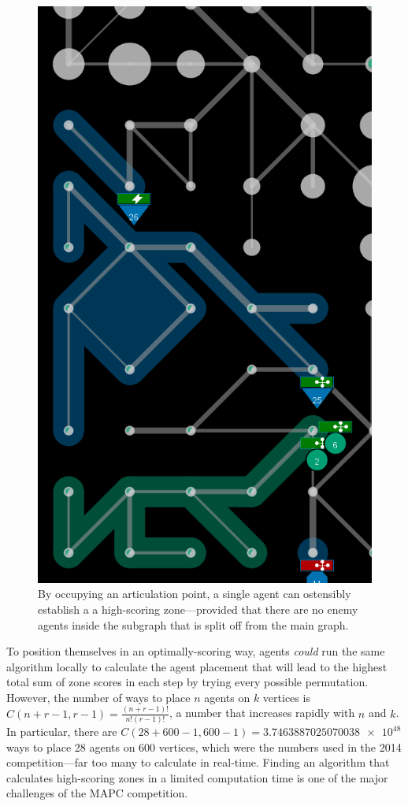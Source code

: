 \begin{figure}
  \centering
  \includegraphics[height=.5\textheight]{images/articulation_points}
  \caption{By occupying an articulation point, a single agent can ostensibly establish a a high-scoring zone---provided that there are no enemy agents inside the subgraph that is split off from the main graph.}
  \label{fig:articulation_points}
\end{figure}
To position themselves in an optimally-scoring way, agents \emph{could} run the same algorithm locally to calculate the agent placement that will lead to the highest total sum of zone scores in each step by trying every possible permutation.
However, the number of ways to place $n$ agents on $k$ vertices is $C \left (n+r-1,r-1\right )= \frac{\left(n+r-1 \right )!}{n!\left(r-1 \right )!}$, a number that increases rapidly with $n$ and $k$.
In particular, there are $C \left (28+600-1,600-1 \right ) =\num{3.7463887025070038e+48}$ ways to place 28 agents on 600 vertices, which were the numbers used in the 2014 competition---far too many to calculate in real-time.
Finding an algorithm that calculates high-scoring zones in a limited computation time is one of the major challenges of the MAPC competition.

